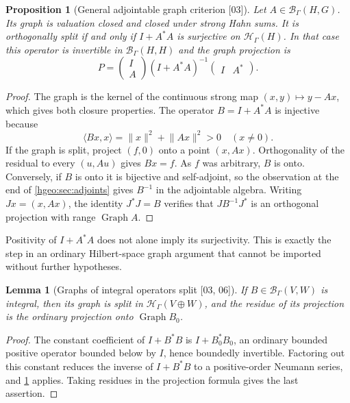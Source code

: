 \documentclass[11pt,letterpaper]{article}
\numberwithin{equation}{section}
\newtheorem{proposition}[proposition]{Proposition}
\newtheorem{lemma}[lemma]{Lemma}
\theoremstyle{definition}
\theoremstyle{remark}
\newcommand{\HH}[1]{\mathscr H_\Gamma(#1)}
\newcommand{\BB}[2]{\mathscr B_\Gamma(#1,#2)}
\newcommand{\Graph}{\operatorname{Graph}}
\newcommand{\ip}[2]{\langle #1,#2\rangle}
\newcommand{\norm}[1]{\lVert #1\rVert}
\newcommand{\src}[1]{\textup{\textsf{\small[#1]}}}
\begin{document}
\begin{proposition}[General adjointable graph criterion \src{03}]
\label{hgeo:prop:graphcriterion}
Let $A\in\BB{H}{G}$. Its graph is valuation closed and closed under
strong Hahn sums. It is orthogonally split if and only if
$I+A^*A$ is surjective on $\HH{H}$. In that case this operator is
invertible in $\BB{H}{H}$ and the graph projection is
\[
 P=\begin{pmatrix}I\\A\end{pmatrix}
       (I+A^*A)^{-1}\begin{pmatrix}I&A^*\end{pmatrix}.
\]
\end{proposition}
\begin{proof}
The graph is the kernel of the continuous strong map
$(x,y)\mapsto y-Ax$, which gives both closure properties.
The operator $B=I+A^*A$ is injective because
\[
 \ip{Bx}{x}=\norm{x}^2+\norm{Ax}^2>0\quad(x\ne0).
\]
If the graph is split, project $(f,0)$ onto a point $(x,Ax)$.
Orthogonality of the residual to every $(u,Au)$ gives $Bx=f$.
As $f$ was arbitrary, $B$ is onto. Conversely, if $B$ is onto it is
bijective and self-adjoint, so the observation at the end of
\cref{hgeo:sec:adjoints} gives $B^{-1}$ in the adjointable algebra.
Writing $Jx=(x,Ax)$, the identity $J^*J=B$ verifies that
$JB^{-1}J^*$ is an orthogonal projection with range $\Graph A$.
\end{proof}

Positivity of $I+A^*A$ does not alone imply its surjectivity. This is
exactly the step in an ordinary Hilbert-space graph argument that
cannot be imported without further hypotheses.

\begin{lemma}[Graphs of integral operators split \src{03, 06}]
\label{hgeo:lem:finitegraph}
If $B\in\BB{V}{W}$ is integral, then its graph is split in $\HH{V\oplus W}$,
and the residue of its projection is the ordinary projection onto
$\Graph B_0$.
\end{lemma}
\begin{proof}
The constant coefficient of $I+B^*B$ is $I+B_0^*B_0$, an ordinary bounded
positive operator bounded below by $I$, hence boundedly invertible.
Factoring out this constant reduces the inverse of $I+B^*B$ to a
positive-order Neumann series, and \cref{hgeo:prop:graphcriterion} applies.
Taking residues in the projection formula gives the last assertion.
\end{proof}
\end{document}
